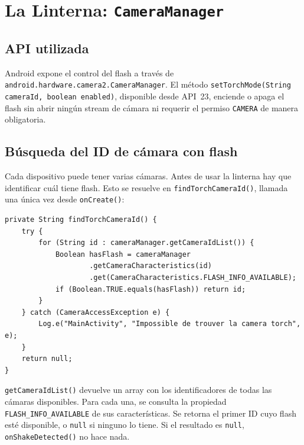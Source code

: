 \documentclass[12pt, a4paper]{article}
\begin{document}
\section{La Linterna: \texttt{CameraManager}}

\subsection{API utilizada}

Android expone el control del flash a trav\'es de
\texttt{android.hardware.camera2.CameraManager}. El m\'etodo
\texttt{setTorchMode(String cameraId, boolean enabled)}, disponible desde
API~23, enciende o apaga el flash sin abrir ning\'un stream de c\'amara ni
requerir el permiso \texttt{CAMERA} de manera obligatoria.

\subsection{B\'usqueda del ID de c\'amara con flash}

Cada dispositivo puede tener varias c\'amaras. Antes de usar la linterna hay
que identificar cu\'al tiene flash. Esto se resuelve en
\texttt{findTorchCameraId()}, llamada una \'unica vez desde \texttt{onCreate()}:

\begin{lstlisting}[caption={B\'usqueda del ID de c\'amara --- \texttt{MainActivity.java}}]
private String findTorchCameraId() {
    try {
        for (String id : cameraManager.getCameraIdList()) {
            Boolean hasFlash = cameraManager
                    .getCameraCharacteristics(id)
                    .get(CameraCharacteristics.FLASH_INFO_AVAILABLE);
            if (Boolean.TRUE.equals(hasFlash)) return id;
        }
    } catch (CameraAccessException e) {
        Log.e("MainActivity", "Impossible de trouver la camera torch", e);
    }
    return null;
}
\end{lstlisting}

\texttt{getCameraIdList()} devuelve un array con los identificadores de todas
las c\'amaras disponibles. Para cada una, se consulta la propiedad
\texttt{FLASH\_INFO\_AVAILABLE} de sus caracter\'isticas. Se retorna el primer
ID cuyo flash est\'e disponible, o \texttt{null} si ninguno lo tiene. Si el
resultado es \texttt{null}, \texttt{onShakeDetected()} no hace nada.
\end{document}
